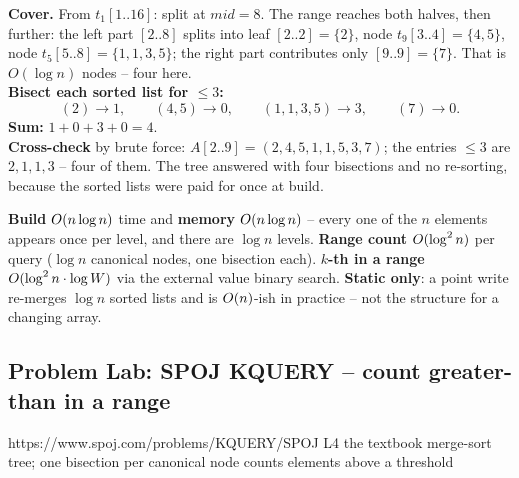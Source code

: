 \begin{tracebox}[count values <= 3 on A(2..9) -- four bisections on the cover of figure c19-mstcount]
\textbf{Cover.} From \(t_1[1..16]\): split at \(\mathit{mid}=8\).  The range reaches both halves, then further: the left part \([2..8]\) splits into leaf \([2..2]=\{2\}\), node \(t_9[3..4]=\{4,5\}\), node \(t_5[5..8]=\{1,1,3,5\}\); the right part contributes only \([9..9]=\{7\}\).  That is \(O(\log n)\) nodes -- four here.\\
\textbf{Bisect each sorted list for \(\le 3\):}
\[
  (2)\to 1,\qquad (4,5)\to 0,\qquad (1,1,3,5)\to 3,\qquad (7)\to 0 .
\]
\textbf{Sum:} \(1+0+3+0=\boxed{4}\).\\
\textbf{Cross-check} by brute force: \(A[2..9]=(2,4,5,1,1,5,3,7)\); the entries \(\le 3\) are \(2,1,1,3\) -- four of them.  The tree answered with four bisections and no re-sorting, because the sorted lists were paid for once at build.
\end{tracebox}

\begin{complexitybox}
\textbf{Build} \(O(n\log n)\) time and \textbf{memory} \(O(n\log n)\) -- every one of the \(n\) elements appears once per level, and there are \(\log n\) levels.  \textbf{Range count} \(O(\log^2 n)\) per query (\(\log n\) canonical nodes, one bisection each).  \textbf{\(k\)-th in a range} \(O(\log^2 n\cdot\log W)\) via the external value binary search.  \textbf{Static only}: a point write re-merges \(\log n\) sorted lists and is \(O(n)\)-ish in practice -- not the structure for a changing array.
\end{complexitybox}

\subsection{Problem Lab: SPOJ KQUERY -- count greater-than in a range}

  {https://www.spoj.com/problems/KQUERY/}{SPOJ L4}
  {the textbook merge-sort tree; one bisection per canonical node counts elements above a threshold}

